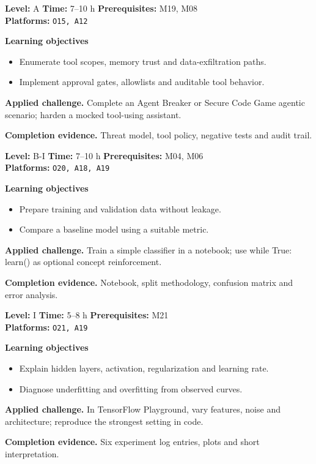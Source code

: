 \documentclass[10pt,letterpaper,oneside]{article}
\begin{document}
\begin{skillbox}[title={M20 \quad Agentic workflow and tool-use security}]
\textbf{Level:} A \quad \textbf{Time:} 7--10 h \quad \textbf{Prerequisites:} M19, M08\\
\textbf{Platforms:} \texttt{O15, A12}\par
\textbf{Learning objectives}
\begin{itemize}
\item Enumerate tool scopes, memory trust and data-exfiltration paths.
\item Implement approval gates, allowlists and auditable tool behavior.
\end{itemize}
\textbf{Applied challenge.} Complete an Agent Breaker or Secure Code Game agentic scenario; harden a mocked tool-using assistant.\par
\textbf{Completion evidence.} Threat model, tool policy, negative tests and audit trail.\par
\end{skillbox}
\vspace{2.5pt}
\begin{skillbox}[title={M21 \quad Machine learning foundations}]
\textbf{Level:} B-I \quad \textbf{Time:} 7--10 h \quad \textbf{Prerequisites:} M04, M06\\
\textbf{Platforms:} \texttt{O20, A18, A19}\par
\textbf{Learning objectives}
\begin{itemize}
\item Prepare training and validation data without leakage.
\item Compare a baseline model using a suitable metric.
\end{itemize}
\textbf{Applied challenge.} Train a simple classifier in a notebook; use while True: learn() as optional concept reinforcement.\par
\textbf{Completion evidence.} Notebook, split methodology, confusion matrix and error analysis.\par
\end{skillbox}
\vspace{2.5pt}
\begin{skillbox}[title={M22 \quad Neural-network experiments}]
\textbf{Level:} I \quad \textbf{Time:} 5--8 h \quad \textbf{Prerequisites:} M21\\
\textbf{Platforms:} \texttt{O21, A19}\par
\textbf{Learning objectives}
\begin{itemize}
\item Explain hidden layers, activation, regularization and learning rate.
\item Diagnose underfitting and overfitting from observed curves.
\end{itemize}
\textbf{Applied challenge.} In TensorFlow Playground, vary features, noise and architecture; reproduce the strongest setting in code.\par
\textbf{Completion evidence.} Six experiment log entries, plots and short interpretation.\par
\end{skillbox}
\end{document}
